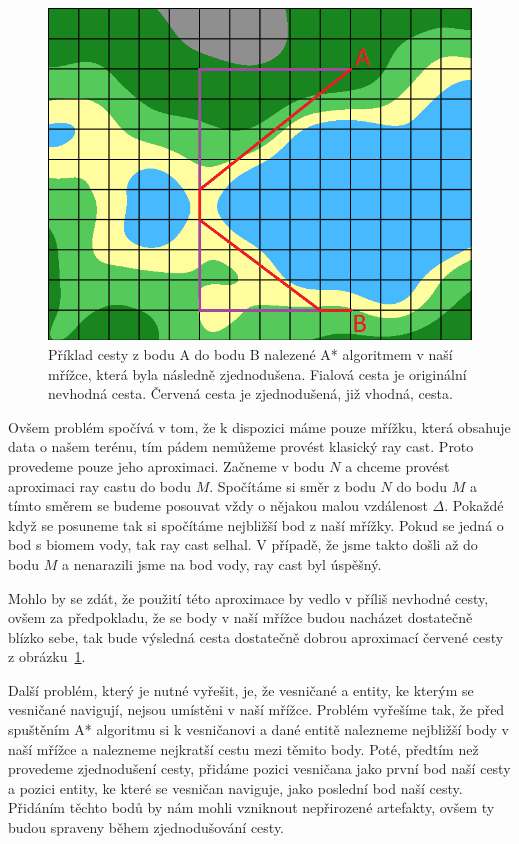 \begin{figure}[!htb]
    \centering
    \includegraphics[width=0.66\linewidth]{img/path_simplified.png}
    \caption{Příklad cesty z bodu A do bodu B nalezené A* algoritmem v naší mřížce, která byla následně zjednodušena. Fialová cesta je originální nevhodná cesta. Červená cesta je zjednodušená, již vhodná, cesta.}
    \label{fig:path_simplified}
\end{figure}

Ovšem problém spočívá v tom, že k dispozici máme pouze mřížku, která obsahuje data o našem terénu, tím pádem nemůžeme provést klasický ray cast. Proto provedeme pouze jeho aproximaci. Začneme v bodu $N$ a chceme provést aproximaci ray castu do bodu $M$. Spočítáme si směr z bodu $N$ do bodu $M$ a tímto směrem se budeme posouvat vždy o nějakou malou vzdálenost $\Delta$. Pokaždé když se posuneme tak si spočítáme nejbližší bod z naší mřížky. Pokud se jedná o bod s biomem vody, tak ray cast selhal. V případě, že jsme takto došli až do bodu $M$ a nenarazili jsme na bod vody, ray cast byl úspěšný.

Mohlo by se zdát, že použití této aproximace by vedlo v příliš nevhodné cesty, ovšem za předpokladu, že se body v naší mřížce budou nacházet dostatečně blízko sebe, tak bude výsledná cesta dostatečně dobrou aproximací červené cesty z obrázku~\ref{fig:path_simplified}.

Další problém, který je nutné vyřešit, je, že vesničané a entity, ke kterým se vesničané navigují, nejsou umístěni v naší mřížce. Problém vyřešíme tak, že před spuštěním A* algoritmu si k vesničanovi a dané entitě nalezneme nejbližší body v naší mřížce a nalezneme nejkratší cestu mezi těmito body. Poté, předtím než provedeme zjednodušení cesty, přidáme pozici vesničana jako první bod naší cesty a pozici entity, ke které se vesničan naviguje, jako poslední bod naší cesty. Přidáním těchto bodů by nám mohli vzniknout nepřirozené artefakty, ovšem ty budou spraveny během zjednodušování cesty.

